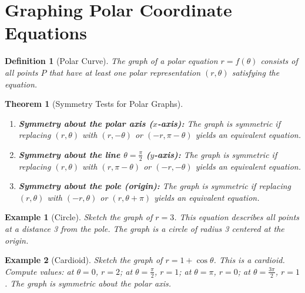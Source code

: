 \documentclass[11pt,a4paper]{article}
\newtheorem{example}{Example}
\newtheorem{theorem}{Theorem}
\newtheorem{definition}{Definition}
\begin{document}
\section{Graphing Polar Coordinate Equations}
\begin{definition}[Polar Curve]
The graph of a polar equation $r = f(\theta)$ consists of all points $P$ that have at least one polar representation $(r, \theta)$ satisfying the equation.
\end{definition}
\begin{theorem}[Symmetry Tests for Polar Graphs]
\begin{enumerate}
\item \textbf{Symmetry about the polar axis ($x$-axis):} The graph is symmetric if replacing $(r, \theta)$ with $(r, -\theta)$ or $(-r, \pi - \theta)$ yields an equivalent equation.
\item \textbf{Symmetry about the line $\theta = \frac{\pi}{2}$ ($y$-axis):} The graph is symmetric if replacing $(r, \theta)$ with $(r, \pi - \theta)$ or $(-r, -\theta)$ yields an equivalent equation.
\item \textbf{Symmetry about the pole (origin):} The graph is symmetric if replacing $(r, \theta)$ with $(-r, \theta)$ or $(r, \theta + \pi)$ yields an equivalent equation.
\end{enumerate}
\end{theorem}
\begin{example}[Circle]
Sketch the graph of $r = 3$.
This equation describes all points at a distance 3 from the pole. The graph is a circle of radius 3 centered at the origin.
\begin{center}
\end{center}
\end{example}
\begin{example}[Cardioid]
Sketch the graph of $r = 1 + \cos \theta$.
This is a cardioid. Compute values: at $\theta = 0$, $r = 2$; at $\theta = \frac{\pi}{2}$, $r = 1$; at $\theta = \pi$, $r = 0$; at $\theta = \frac{3\pi}{2}$, $r = 1$. The graph is symmetric about the polar axis.
\begin{center}
\end{center}
\end{example}
\end{document}
